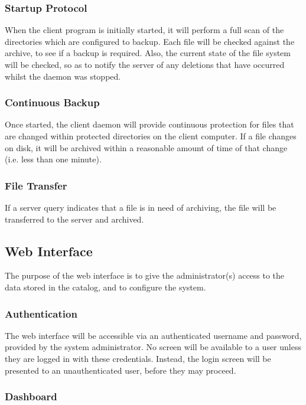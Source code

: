 \subsubsection{Startup Protocol}

When the client program is initially started, it will perform a full scan of
the directories which are configured to backup. Each file will be checked
against the archive, to see if a backup is required. Also, the current state of
the file system will be checked, so as to notify the server of any deletions
that have occurred whilst the daemon was stopped.

\subsubsection{Continuous Backup}

Once started, the client daemon will provide continuous protection for files
that are changed within protected directories on the client computer. If a file
changes on disk, it will be archived within a reasonable amount of time of that
change (i.e. less than one minute).

\subsubsection{File Transfer}

If a server query indicates that a file is in need of archiving, the file
will be transferred to the server and archived.

\subsection{Web Interface}

The purpose of the web interface is to give the administrator(s) access to the
data stored in the catalog, and to configure the system.

\subsubsection{Authentication}

The web interface will be accessible via an authenticated username and
password, provided by the system administrator. No screen will be available to
a user unless they are logged in with these credentials. Instead, the login
screen will be presented to an unauthenticated user, before they may proceed.

\subsubsection{Dashboard}

